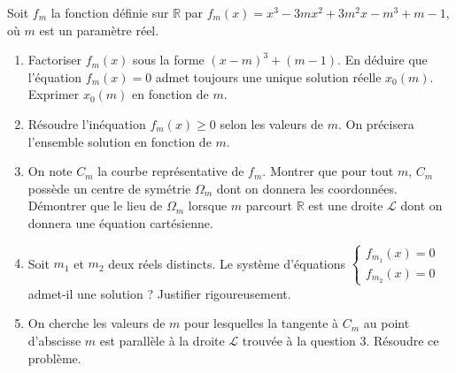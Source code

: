 \documentclass[11pt]{article}
\begin{document}
\begin{exercice}
Soit $f_m$ la fonction définie sur $\mathbb{R}$ par $f_m(x) = x^3 - 3mx^2 + 3m^2x - m^3 + m - 1$, où $m$ est un paramètre réel.
\begin{enumerate}
    \item Factoriser $f_m(x)$ sous la forme $(x-m)^3 + (m-1)$. En déduire que l'équation $f_m(x) = 0$ admet toujours une unique solution réelle $x_0(m)$. Exprimer $x_0(m)$ en fonction de $m$.
    \item Résoudre l'inéquation $f_m(x) \geq 0$ selon les valeurs de $m$. On précisera l'ensemble solution en fonction de $m$.
    \item On note $C_m$ la courbe représentative de $f_m$. Montrer que pour tout $m$, $C_m$ possède un centre de symétrie $\Omega_m$ dont on donnera les coordonnées. Démontrer que le lieu de $\Omega_m$ lorsque $m$ parcourt $\mathbb{R}$ est une droite $\mathcal{L}$ dont on donnera une équation cartésienne.
    \item Soit $m_1$ et $m_2$ deux réels distincts. Le système d'équations $\begin{cases} f_{m_1}(x) = 0 \\ f_{m_2}(x) = 0 \end{cases}$ admet-il une solution ? Justifier rigoureusement.
    \item On cherche les valeurs de $m$ pour lesquelles la tangente à $C_m$ au point d'abscisse $m$ est parallèle à la droite $\mathcal{L}$ trouvée à la question 3. Résoudre ce problème.
\end{enumerate}
\end{exercice}
\end{document}
